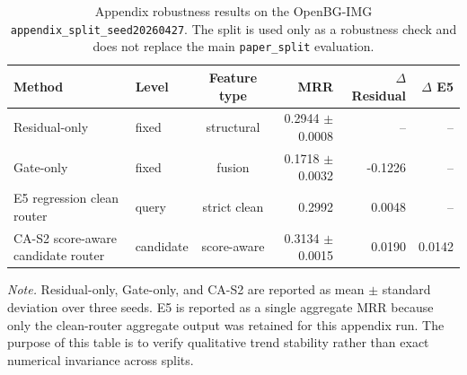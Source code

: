 \begin{table}[H]
\centering
\caption{Appendix robustness results on the OpenBG-IMG \texttt{appendix\_split\_seed20260427}. The split is used only as a robustness check and does not replace the main \texttt{paper\_split} evaluation.}
\label{tab:appendix_split_robustness_results}
\small
\setlength{\tabcolsep}{4pt}
\begin{tabular}{llcrrr}
\toprule
Method & Level & Feature type & MRR & $\Delta$ Residual & $\Delta$ E5 \\
\midrule
Residual-only & fixed & structural & 0.2944 $\pm$ 0.0008 & -- & -- \\
Gate-only & fixed & fusion & 0.1718 $\pm$ 0.0032 & -0.1226 & -- \\
E5 regression clean router & query & strict clean & 0.2992 & 0.0048 & -- \\
CA-S2 score-aware candidate router & candidate & score-aware & 0.3134 $\pm$ 0.0015 & 0.0190 & 0.0142 \\
\bottomrule
\end{tabular}

\vspace{0.3em}
\begin{minipage}{0.92\textwidth}
\footnotesize
\emph{Note.} Residual-only, Gate-only, and CA-S2 are reported as mean $\pm$ standard deviation over three seeds. E5 is reported as a single aggregate MRR because only the clean-router aggregate output was retained for this appendix run. The purpose of this table is to verify qualitative trend stability rather than exact numerical invariance across splits.
\end{minipage}
\end{table}

